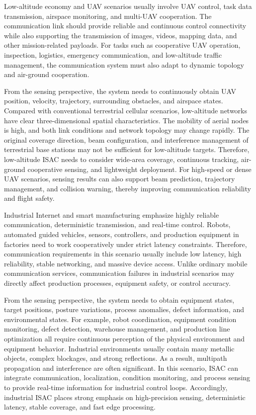 
Low-altitude economy and UAV scenarios usually involve UAV control, task data transmission, airspace monitoring, and multi-UAV cooperation.
The communication link should provide reliable and continuous control connectivity while also supporting the transmission of images, videos, mapping data, and other mission-related payloads.
For tasks such as cooperative UAV operation, inspection, logistics, emergency communication, and low-altitude traffic management, the communication system must also adapt to dynamic topology and air-ground cooperation.

From the sensing perspective, the system needs to continuously obtain UAV position, velocity, trajectory, surrounding obstacles, and airspace states.
Compared with conventional terrestrial cellular scenarios, low-altitude networks have clear three-dimensional spatial characteristics.
The mobility of aerial nodes is high, and both link conditions and network topology may change rapidly.
The original coverage direction, beam configuration, and interference management of terrestrial base stations may not be sufficient for low-altitude targets.
Therefore, low-altitude ISAC needs to consider wide-area coverage, continuous tracking, air-ground cooperative sensing, and lightweight deployment.
For high-speed or dense UAV scenarios, sensing results can also support beam prediction, trajectory management, and collision warning, thereby improving communication reliability and flight safety.


Industrial Internet and smart manufacturing emphasize highly reliable communication, deterministic transmission, and real-time control.
Robots, automated guided vehicles, sensors, controllers, and production equipment in factories need to work cooperatively under strict latency constraints.
Therefore, communication requirements in this scenario usually include low latency, high reliability, stable networking, and massive device access.
Unlike ordinary mobile communication services, communication failures in industrial scenarios may directly affect production processes, equipment safety, or control accuracy.

From the sensing perspective, the system needs to obtain equipment states, target positions, posture variations, process anomalies, defect information, and environmental states.
For example, robot coordination, equipment condition monitoring, defect detection, warehouse management, and production line optimization all require continuous perception of the physical environment and equipment behavior.
Industrial environments usually contain many metallic objects, complex blockages, and strong reflections.
As a result, multipath propagation and interference are often significant.
In this scenario, ISAC can integrate communication, localization, condition monitoring, and process sensing to provide real-time information for industrial control loops.
Accordingly, industrial ISAC places strong emphasis on high-precision sensing, deterministic latency, stable coverage, and fast edge processing.


